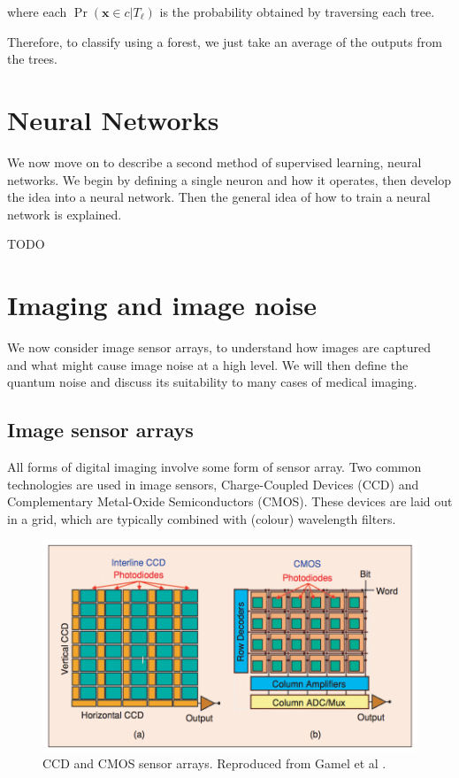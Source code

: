 \documentclass[12pt,twoside,notitlepage]{report}
\newcommand{\vc}[1]{\mathbf{#1}}
\begin{document}
            where each $\Pr(\vc{x} \in c | T_\ell)$ is the probability obtained by traversing each tree. \cite{criminisi2013decision}

            Therefore, to classify using a forest, we just take an average of the outputs from the trees. 





    \section{Neural Networks}
        We now move on to describe a second method of supervised learning, neural networks. We begin 
        by defining a single neuron and how it operates, then develop the idea into a neural network. Then the 
        general idea of how to train a neural network is explained.
        

        \begin{framed}
            TODO
        \end{framed}





    \section{Imaging and image noise} 
        We now consider image sensor arrays, to understand how images are captured and what might 
        cause image noise at a high level. We will then define the quantum noise and discuss its suitability to many 
        cases of medical imaging. 

        \subsection{Image sensor arrays}
            All forms of digital imaging involve some form of sensor array. Two common technologies are used in image 
            sensors, Charge-Coupled Devices (CCD) and Complementary Metal-Oxide Semiconductors (CMOS). These devices are 
            laid out in a grid, which are typically combined with (colour) wavelength filters. 

            \begin{figure}[H]
                \centering
                \includegraphics[scale=0.30]{sensor_arrays}
                \caption{CCD and CMOS sensor arrays. Reproduced from Gamel et al \cite{gamal2005cmos}.}
                \label{fig:image_pipeline}
            \end{figure}
\end{document}
